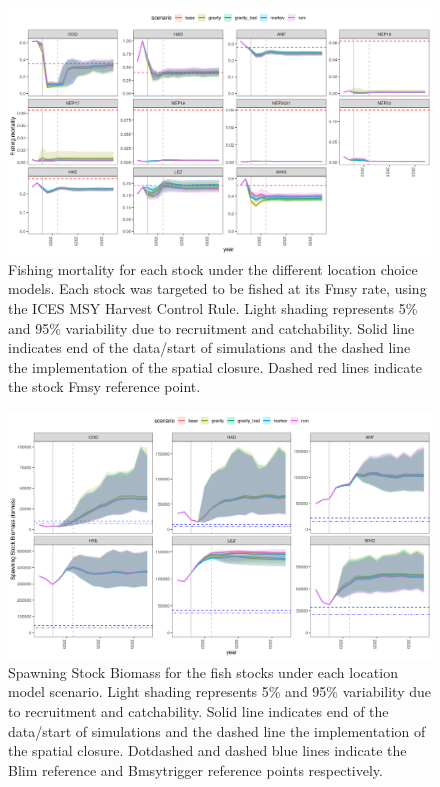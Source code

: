 \documentclass[12pt, halfline, a4paper]{ouparticle}
\begin{document}
\begin{figure}[!ht]
	\centering
	\includegraphics[width=1\linewidth]{figures/F_difference}
	\caption{Fishing mortality for each stock under the different location
		choice models. Each stock was targeted to be fished at its Fmsy
		rate, using the ICES MSY Harvest Control Rule. Light shading
		represents 5\% and 95\% variability due to recruitment and
		catchability. Solid line indicates end of the data/start of
		simulations and the dashed line the implementation of the
		spatial closure. Dashed red lines indicate the stock Fmsy
		reference point.} 
	\label{fig:F}
\end{figure}	

\begin{figure}[!ht]
	\centering
	\includegraphics[width=1\linewidth]{figures/SSB_difference}
	\caption{Spawning Stock Biomass for the fish stocks under each location
		model scenario. Light shading represents 5\% and 95\%
		variability due to recruitment and catchability. Solid line
		indicates end of the data/start of simulations and the dashed
		line the implementation of the spatial closure.  Dotdashed and
		dashed blue lines indicate the Blim reference and Bmsytrigger
		reference points respectively.} 
	\label{fig:SSB}
\end{figure}	
\end{document}
